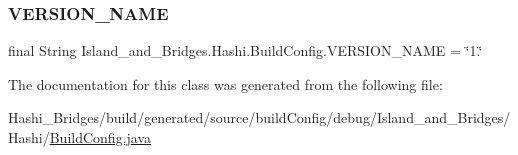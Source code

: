 \subsubsection{\texorpdfstring{V\+E\+R\+S\+I\+O\+N\+\_\+\+N\+A\+ME}{VERSION\_NAME}}
{\footnotesize\ttfamily final String Island\+\_\+and\+\_\+\+Bridges.\+Hashi.\+Build\+Config.\+V\+E\+R\+S\+I\+O\+N\+\_\+\+N\+A\+ME = \char`\"{}1.\char`\"{}\hspace{0.3cm}{\ttfamily [static]}}



The documentation for this class was generated from the following file\+:\begin{DoxyCompactItemize}
\item 
Hashi\+\_\+\+Bridges/build/generated/source/build\+Config/debug/\+Island\+\_\+and\+\_\+\+Bridges/\+Hashi/\mbox{\hyperlink{debug_2_island__and___bridges_2_hashi_2_build_config_8java}{Build\+Config.\+java}}\end{DoxyCompactItemize}

